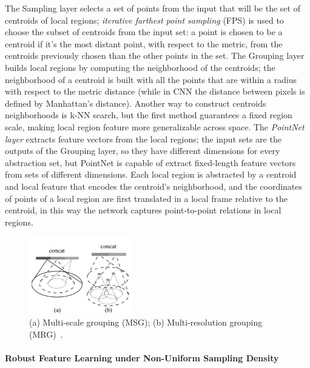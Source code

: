 The Sampling layer selects a set of points from the input that will be the set of centroids of local regions; \textit{iterative farthest point sampling} (FPS) is used to choose the subset of centroids from the input set: a point is chosen to be a centroid if it's the most distant point, with respect to the metric, from the centroids previously chosen than the other points in the set. The Grouping layer builds local regions by computing the neighborhood of the centroids; the neighborhood of a centroid is built with all the points that are within a radius with respect to the metric distance (while in CNN the distance between pixels is defined by Manhattan's distance). Another way to construct centroids neighborhoods is k-NN search, but the first method guarantees a fixed region scale, making local region feature more generalizable across space. The \textit{PointNet layer} extracts feature vectors from the local regions; the input sets are the outputs of the Grouping layer, so they have different dimensions for every abstraction set, but PointNet is capable of extract fixed-length feature vectors from sets of different dimensions. Each local region is abstracted by a centroid and local feature that encodes the centroid's neighborhood, and the coordinates of points of a local region are first translated in a local frame relative to the centroid, in this way the network captures point-to-point relations in local regions.

\begin{figure}[ht]
    \centering
    \includegraphics[width=0.4\textwidth]{images/density_adaptive_pointnet.png}
    \caption{(a) Multi-scale grouping (MSG); (b) Multi-resolution grouping (MRG)~\cite{qi2017pointnet++}.}
    \label{fig:density_adaptive_pointnet}
\end{figure}

\paragraph{Robust Feature Learning under Non-Uniform Sampling Density}

